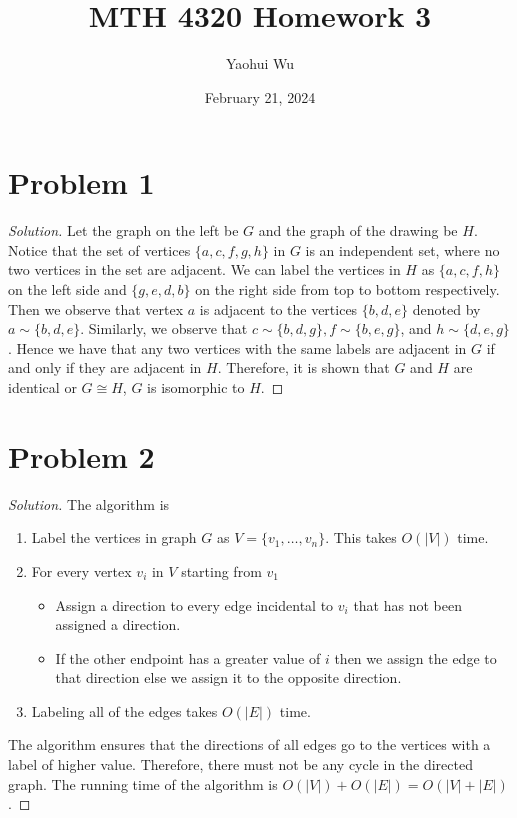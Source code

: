 \documentclass[12pt]{article}
\title{MTH 4320 Homework 3}
\author{Yaohui Wu}
\date{February 21, 2024}
\newenvironment{solution}{\begin{proof}[Solution]}{\end{proof}}
\begin{document}
\maketitle
\section*{Problem 1}
\begin{solution}
    Let the graph on the left be \(G\) and the graph of the drawing be \(H\).
    Notice that the set of vertices \(\{a,c,f,g,h\}\) in \(G\) is an independent
    set, where no two vertices in the set are adjacent. We can label the vertices
    in \(H\) as \(\{a,c,f,h\}\) on the left side and \(\{g,e,d,b\}\) on the right
    side from top to bottom respectively. Then we observe that vertex \(a\) is
    adjacent to the vertices \(\{b,d,e\}\) denoted by \(a\sim\{b,d,e\}\).
    Similarly, we observe that \(c\sim\{b,d,g\},f\sim\{b,e,g\}\), and \(h\sim\{d,e,g\}\).
    Hence we have that any two vertices with the same labels are adjacent in \(G\)
    if and only if they are adjacent in \(H\). Therefore, it is shown that \(G\)
    and \(H\) are identical or \(G\cong H\), \(G\) is isomorphic to \(H\).
\end{solution}

\section*{Problem 2}
\begin{solution}
    The algorithm is
    \begin{enumerate}
        \item Label the vertices in graph \(G\) as \(V=\{v_1,\dots,v_n\}\).
        This takes \(O(|V|)\) time.
        \item For every vertex \(v_i\) in \(V\) starting from \(v_1\)
        \begin{itemize}
            \item Assign a direction to every edge incidental to \(v_i\) that
            has not been assigned a direction.
            \item If the other endpoint has a greater value of \(i\) then we
            assign the edge to that direction else we assign it to the opposite
            direction.
        \end{itemize}
        \item Labeling all of the edges takes \(O(|E|)\) time.
    \end{enumerate}
    The algorithm ensures that the directions of all edges go to the vertices
    with a label of higher value. Therefore, there must not be any cycle in
    the directed graph. The running time of the algorithm is
    \(O(|V|)+O(|E|)=O(|V|+|E|)\).
\end{solution}
\end{document}
